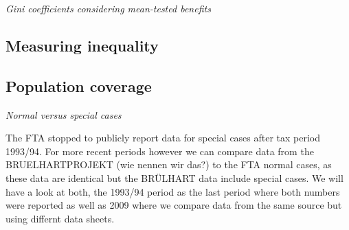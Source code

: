 \documentclass[twoside]{article}\usepackage[]{graphicx}\usepackage[]{color}
\newenvironment{knitrout}{}{} %
\begin{document}
\begin{multicols}{2}
\begin{knitrout}
\end{knitrout}



\emph{Gini coefficients considering mean-tested benefits}

\subsection{Measuring inequality}


\subsection{Population coverage}

\emph{Normal versus special cases}

The FTA stopped to publicly report data for special cases after tax period 1993/94. 
For more recent periods however we can compare data from the 
BRUELHARTPROJEKT (wie nennen wir das?) to the FTA normal cases, as these data are 
identical but the BRÜLHART data include special cases. 
We will have a look at both, the 1993/94 period as the last period where both 
numbers were reported as well as 2009 where we compare data from the same source 
but using differnt data sheets.


\begin{knitrout}
\color{fgcolor}\begin{figure}[]


\end{figure}
\end{knitrout}
\end{multicols}
\end{document}
